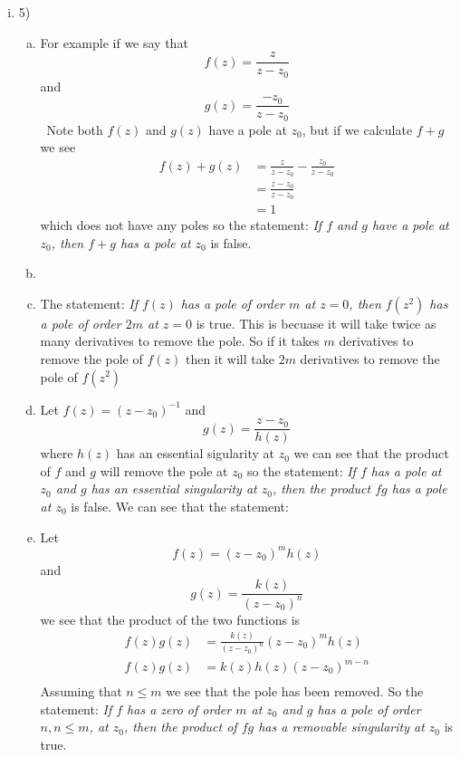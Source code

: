 \documentclass[11pt]{article}
\begin{document}
\begin{enumerate}
\begin{enumerate}[(i)]
\item 5)
\begin{enumerate}[(a)]
\item
For example if we say that
$$f(z) = \frac{z}{z-z_0}$$
and
$$g(z) = \frac{-z_0}{z-z_0}$$\
Note both $f(z)$ and $g(z)$ have a pole at $z_0$, but if we calculate $f+g$ we see
\begin{align*}
f(z)+g(z) &= \frac{z}{z-z_0}-\frac{z_0}{z-z_0}\\
&= \frac{z-z_0}{z-z_0}\\
&=1
\end{align*}
which does not have any poles so the statement: \textit{If $f$ and $g$ have a pole at $z_0$, then $f+g$ has a pole at $z_0$} is false.

\item


\item
The statement: \textit{If $f(z)$ has a pole of order $m$ at $z=0$, then $f(z^2)$ has a pole of order $2m$ at $z=0$} is true. This is becuase it will take twice as many derivatives to remove the pole. So if it takes $m$ derivatives to remove the pole of $f(z)$ then it will take $2m$ derivatives to remove the pole of $f(z^2)$

\item
Let $f(z) = (z-z_0)^{-1}$ and 
$$g(z) = \frac{z-z_0}{h(z)}$$
where $h(z)$ has an essential sigularity at $z_0$ we can see that the product of $f$ and $g$ will remove the pole at $z_0$ so the statement: \textit{If $f$ has a pole at $z_0$ and $g$ has an essential singularity at $z_0$, then the product $fg$ has a pole at $z_0$} is false.
We can see that the statement:

\item
Let
$$f(z) = (z-z_0)^mh(z)$$
and 
$$g(z) = \frac{k(z)}{(z-z_0)^n}$$
we see that the product of the two functions is
\begin{align*}
f(z)g(z) &= \frac{k(z)}{(z-z_0)^n}(z-z_0)^mh(z)\\
f(z)g(z) &= k(z)h(z)(z-z_0)^{m-n}\\
\end{align*}
Assuming that $n\le m$ we see that the pole has been removed. So the statement: \textit{If $f$ has a zero of order $m$ at $z_0$ and $g$ has a pole of order $n, n\le m$, at $z_0$, then the product of $fg$ has a removable singularity at $z_0$} is true.
\end{enumerate}

\end{enumerate}
\end{enumerate}
\end{document}
